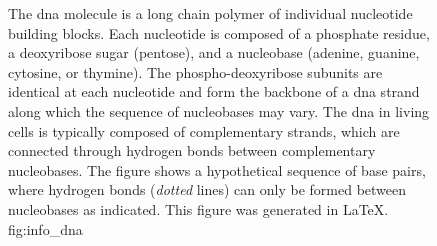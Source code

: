 \begin{figure}[!htb]
{%
}

{
The \gls{dna} molecule is a long chain polymer of individual nucleotide building blocks.
Each nucleotide is composed of a phosphate residue, a deoxyribose sugar (pentose), and a nucleobase (adenine, guanine, cytosine, or thymine).
The phospho-deoxyribose subunits are identical at each nucleotide and form the backbone of a \gls{dna} strand along which the sequence of nucleobases may vary.
The \gls{dna} in living cells is typically composed of  complementary strands, which are connected through hydrogen bonds between complementary nucleobases.
The figure shows a hypothetical sequence of  base pairs, where hydrogen bonds (\emph{dotted} lines) can only be formed between nucleobases as indicated.
This figure was generated in \LaTeX.}
{fig:info_dna}
\end{figure}
